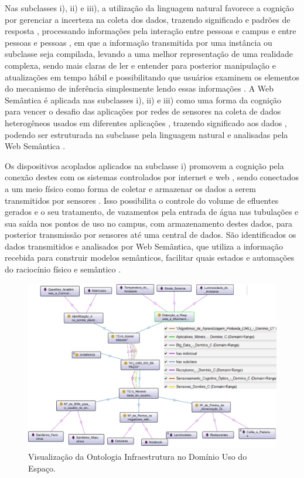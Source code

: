 \documentclass[portuguese]{textolivre}
\begin{document}
Nas subclasses i), ii) e iii), a utilização da linguagem natural favorece a cognição por gerenciar a incerteza na coleta dos dados, trazendo significado e padrões de resposta \cite{hudec2019}, processando informações pela interação entre pessoas e campus e entre pessoas e pessoas \cite{donofrio2018}, em que a informação transmitida por uma instância ou subclasse seja compilada, levando a uma melhor representação de uma realidade complexa, sendo mais claras de ler e entender para posterior manipulação e atualizações em tempo hábil \cite{tabacchi2019} e possibilitando que usuários examinem os elementos do mecanismo de inferência simplesmente lendo essas informações \cite{alonso2018}. A Web Semântica é aplicada nas subclasses i), ii) e iii) como uma forma da cognição para vencer o desafio das aplicações por redes de sensores na coleta de dados heterogêneos usados em diferentes aplicações \cite{LimaTeran2019}, trazendo significado aos dados \cite{cuenca2018}, podendo ser estruturada na subclasse pela linguagem natural e analisadas pela Web Semântica \cite{park2019, karasan2021}.

Os dispositivos acoplados aplicados na subclasse i) promovem a cognição pela conexão destes com os sistemas controlados por internet e web \cite{donofrio2018}, sendo conectados a um meio físico como forma de coletar e armazenar os dados a serem transmitidos por sensores \cite{rausch2021}. Isso possibilita o controle do volume de efluentes gerados e o seu tratamento, de vazamentos pela entrada de água nas tubulações e sua saída nos pontos de uso no campus, com armazenamento destes dados, para posterior transmissão por sensores até uma central de dados. São identificados os dados transmitidos e analisados por Web Semântica, que utiliza a informação recebida para construir modelos semânticos, facilitar quais estados e automações do raciocínio físico e semântico \cite{park2019}.

\begin{figure}[h!]
    \centering
    \includegraphics[width=0.90\linewidth]{images/FIGURA7_1.png}
    \caption{Visualização da Ontologia Infraestrutura no Domínio Uso do Espaço.}
    \label{fig-7}
\end{figure}
\end{document}

